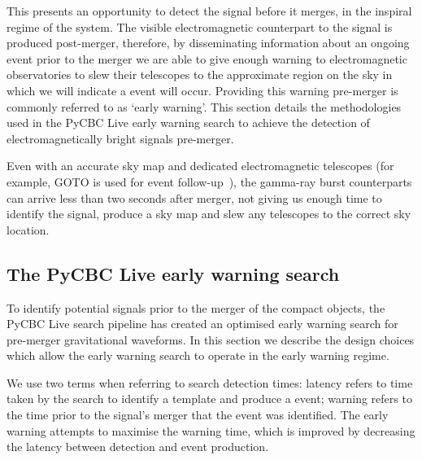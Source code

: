 This presents an opportunity to detect the \gwadj signal before it merges, in the inspiral regime of the system. The visible electromagnetic counterpart to the \gwadj signal is produced post-merger, therefore, by disseminating information about an ongoing \gwadj event prior to the merger we are able to give enough warning to electromagnetic observatories to slew their telescopes to the approximate region on the sky in which we will indicate a \gwadj event will occur. Providing this warning pre-merger is commonly referred to as `early warning'. This section details the methodologies used in the PyCBC Live early warning search to achieve the detection of electromagnetically bright \gwadj signals pre-merger.

Even with an accurate sky map and dedicated electromagnetic telescopes (for example, GOTO is used for \gwadj event follow-up~\cite{GOTO:2020}), the gamma-ray burst counterparts can arrive less than two seconds after merger, not giving us enough time to identify the signal, produce a sky map and slew any telescopes to the correct sky location.

\subsection{\label{6:sec:pycbc-ew-search}The PyCBC Live early warning search}

To identify potential \gwadj signals prior to the merger of the compact objects, the PyCBC Live search pipeline has created an optimised early warning search for pre-merger gravitational waveforms. In this section we describe the design choices which allow the early warning search to operate in the early warning regime.

We use two terms when referring to search detection times: latency refers to time taken by the search to identify a \gwadj template and produce a \gwadj event; warning refers to the time prior to the \gwadj signal's merger that the event was identified. The early warning attempts to maximise the warning time, which is improved by decreasing the latency between detection and event production.

